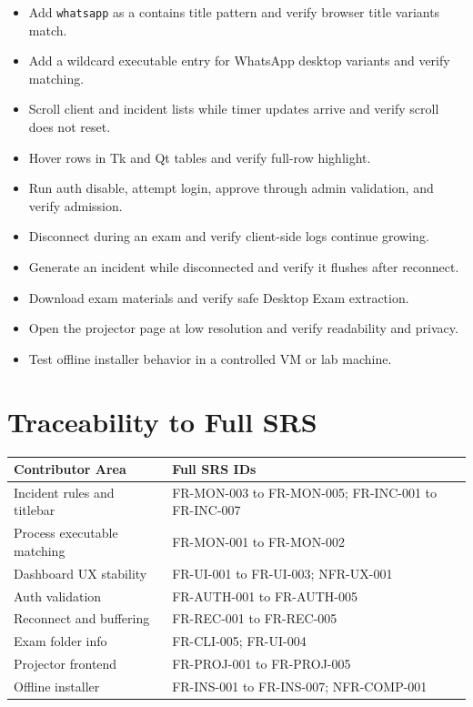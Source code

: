 \documentclass[12pt,a4paper]{article}
\begin{document}
\begin{itemize}
    \item Add \texttt{whatsapp} as a contains title pattern and verify browser title variants match.
    \item Add a wildcard executable entry for WhatsApp desktop variants and verify matching.
    \item Scroll client and incident lists while timer updates arrive and verify scroll does not reset.
    \item Hover rows in Tk and Qt tables and verify full-row highlight.
    \item Run auth disable, attempt login, approve through admin validation, and verify admission.
    \item Disconnect during an exam and verify client-side logs continue growing.
    \item Generate an incident while disconnected and verify it flushes after reconnect.
    \item Download exam materials and verify safe Desktop Exam extraction.
    \item Open the projector page at low resolution and verify readability and privacy.
    \item Test offline installer behavior in a controlled VM or lab machine.
\end{itemize}

\section{Traceability to Full SRS}

\begin{longtable}{L{0.36\textwidth} L{0.54\textwidth}}
\textbf{Contributor Area} & \textbf{Full SRS IDs} \\
\hline
Incident rules and titlebar & FR-MON-003 to FR-MON-005; FR-INC-001 to FR-INC-007 \\
Process executable matching & FR-MON-001 to FR-MON-002 \\
Dashboard UX stability & FR-UI-001 to FR-UI-003; NFR-UX-001 \\
Auth validation & FR-AUTH-001 to FR-AUTH-005 \\
Reconnect and buffering & FR-REC-001 to FR-REC-005 \\
Exam folder info & FR-CLI-005; FR-UI-004 \\
Projector frontend & FR-PROJ-001 to FR-PROJ-005 \\
Offline installer & FR-INS-001 to FR-INS-007; NFR-COMP-001 \\
\end{longtable}
\end{document}
